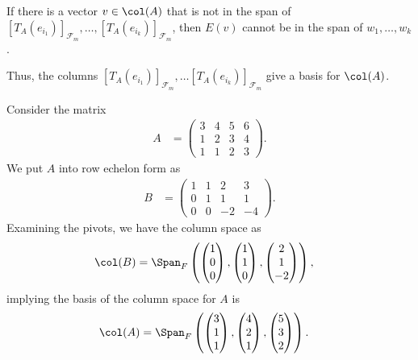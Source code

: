 \documentclass[10pt]{mypackage}
\begin{document}
If there is a vector $v\in \col(A)$ that is not in the span of $\left[T_{A}\left(e_{i_1}\right)\right]_{\mathcal{F}_m},\dots,\left[T_{A}\left(e_{i_k}\right)\right]_{\mathcal{F}_m}$, then $E(v)$ cannot be in the span of $w_1,\dots,w_k$.\newline

Thus, the columns $\left[T_A\left(e_{i_1}\right)\right]_{\mathcal{F}_m},\dots \left[T_A\left(e_{i_k}\right)\right]_{\mathcal{F}_m}$ give a basis for $\col(A)$.
\begin{example}
  Consider the matrix
  \begin{align*}
    A &= \begin{pmatrix}3&4&5&6\\1&2&3&4\\1&1&2&3\end{pmatrix}.
  \end{align*}
  We put $A$ into row echelon form as
  \begin{align*}
    B &= \begin{pmatrix}1 & 1 & 2 & 3 \\ 0 & 1 & 1 & 1 \\ 0 & 0 & -2 & -4\end{pmatrix}.
  \end{align*}
  Examining the pivots, we have the column space as
  \begin{align*}
    \col(B) &= \Span_{F}\left( \begin{pmatrix}1\\0\\0\end{pmatrix}, \begin{pmatrix}1\\1\\0\end{pmatrix}, \begin{pmatrix}2\\1\\-2\end{pmatrix}\right),
  \end{align*}
  implying the basis of the column space for $A$ is
  \begin{align*}
    \col(A) &= \Span_{F}\left( \begin{pmatrix}3\\1\\1\end{pmatrix}, \begin{pmatrix}4\\2\\1\end{pmatrix}, \begin{pmatrix}5\\3\\2\end{pmatrix}\right).
  \end{align*}
\end{example}
\end{document}
